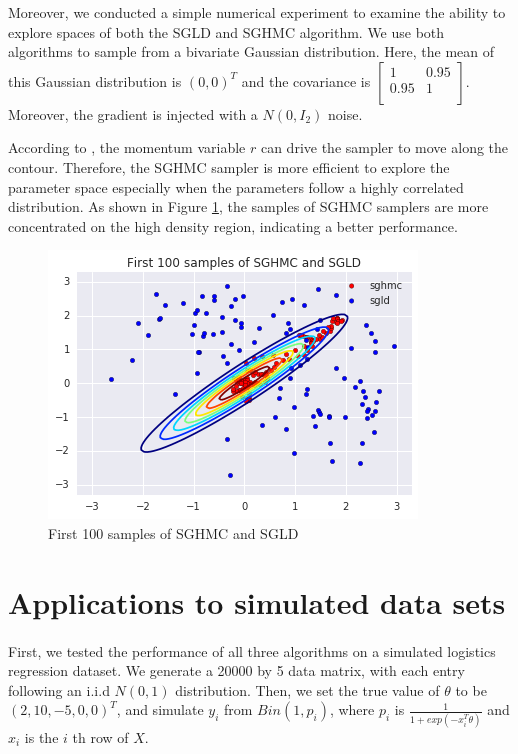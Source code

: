 \documentclass[11pt]{article}
\begin{document}
Moreover, we conducted a simple numerical experiment to examine the ability to explore spaces of both the SGLD and SGHMC algorithm. We use both algorithms to sample from a bivariate Gaussian distribution. Here, the mean of this Gaussian distribution is $(0,0)^T$ and the covariance is 
$
\begin{bmatrix} 
1 & 0.95\\
0.95 & 1 \\
\end{bmatrix}
$. Moreover, the gradient is injected with a $N(0,I_2)$ noise.


According to \cite{chen2014stochastic}, the momentum variable $r$ can drive the sampler to move along the contour. Therefore, the SGHMC sampler is more efficient to explore the parameter space especially when the parameters follow a highly correlated distribution. As shown in Figure \ref{fig:corr}, the samples of SGHMC samplers are more concentrated on the high density region, indicating a better performance.

\begin{figure}[h!]
\centering
\caption{First 100 samples of SGHMC and SGLD}
\label{fig:corr}
\includegraphics[scale=0.5]{mini.png}
\end{figure}

\section{Applications to simulated data sets }
\paragraph{}
First, we tested the performance of all three algorithms on a simulated logistics regression dataset. We generate a 20000 by 5 data matrix, with each entry following an i.i.d $N(0,1)$ distribution. Then, we set the true value of $\theta$ to be $(2,10,-5,0,0)^T$, and simulate $y_i$ from $Bin(1,p_i)$, where $p_i$ is $\frac{1}{1+exp(-x_i^T\theta)}$ and $x_i$ is the $i$ th row of $X$.
\end{document}
